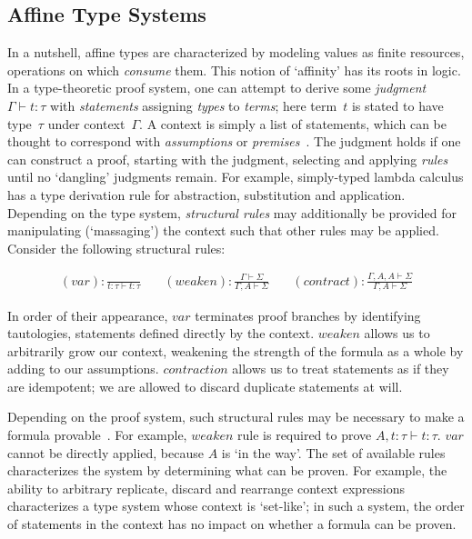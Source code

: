 \subsection{Affine Type Systems}
\label{sec:affine_type_systems}
In a nutshell, affine types are characterized by modeling values as finite resources, operations on which \textit{consume} them. This notion of `affinity' has its roots in logic. In a type-theoretic proof system, one can attempt to derive some \textit{judgment} $\Gamma\vdash{}t:\tau$ with \textit{statements} assigning \textit{types} to \textit{terms}; here term~$t$ is stated to have type~$\tau$ under context~$\Gamma$. A context is simply a list of statements, which can be thought to correspond with \textit{assumptions} or \textit{premises}~\cite{nederpelt2014type}. The judgment holds if one can construct a proof, starting with the judgment, selecting and applying \textit{rules} until no `dangling' judgments remain. For example, simply-typed lambda calculus has a type derivation rule for abstraction, substitution and application. Depending on the type system, \textit{structural rules} may additionally be provided for manipulating (`massaging') the context such that other rules may be applied. Consider the following structural rules:

\[
\begin{aligned}
(var): \frac{}{t:\tau \vdash t: \tau}
&\quad
(weaken): \frac{\Gamma \vdash \Sigma}{\Gamma, A \vdash \Sigma}
&\quad
(contract): \frac{\Gamma, A, A \vdash \Sigma}{\Gamma, A \vdash \Sigma}
\end{aligned}
\]

In order of their appearance, $var$ terminates proof branches by identifying tautologies, statements defined directly by the context. $weaken$ allows us to arbitrarily grow our context, weakening the strength of the formula as a whole by adding to our assumptions. $contraction$ allows us to treat statements as if they are idempotent; we are allowed to discard duplicate statements at will. 

Depending on the proof system, such structural rules may be necessary to make a formula provable~\cite{nederpelt2014type}. For example, $weaken$ rule is required to prove $A, t:\tau\vdash t:\tau$. $var$ cannot be directly applied, because $A$ is `in the way'. The set of available rules characterizes the system by determining what can be proven. For example, the ability to arbitrary replicate, discard and rearrange context expressions characterizes a type system whose context is `set-like'; in such a system, the order of statements in the context has no impact on whether a formula can be proven.

